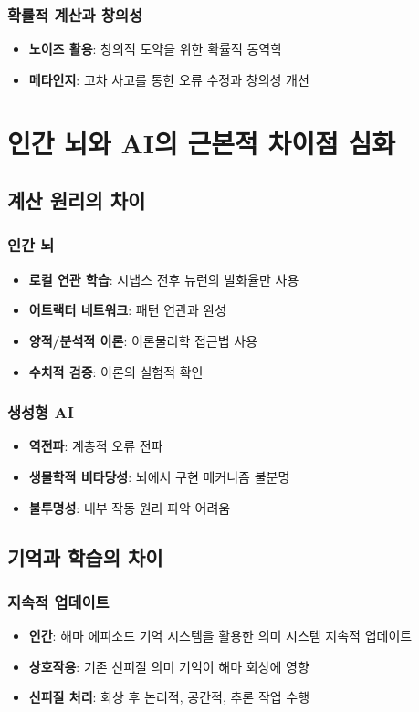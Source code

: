 \documentclass[openany]{book}
\begin{document}
\begin{appendices}
\subsubsection{확률적 계산과 창의성}
\begin{itemize}
\item \textbf{노이즈 활용}: 창의적 도약을 위한 확률적 동역학
\item \textbf{메타인지}: 고차 사고를 통한 오류 수정과 창의성 개선
\end{itemize}

\section{인간 뇌와 AI의 근본적 차이점 심화}

\subsection{계산 원리의 차이}

\subsubsection{인간 뇌}
\begin{itemize}
\item \textbf{로컬 연관 학습}: 시냅스 전후 뉴런의 발화율만 사용
\item \textbf{어트랙터 네트워크}: 패턴 연관과 완성
\item \textbf{양적/분석적 이론}: 이론물리학 접근법 사용
\item \textbf{수치적 검증}: 이론의 실험적 확인
\end{itemize}

\subsubsection{생성형 AI}
\begin{itemize}
\item \textbf{역전파}: 계층적 오류 전파
\item \textbf{생물학적 비타당성}: 뇌에서 구현 메커니즘 불분명
\item \textbf{불투명성}: 내부 작동 원리 파악 어려움
\end{itemize}

\subsection{기억과 학습의 차이}

\subsubsection{지속적 업데이트}
\begin{itemize}
\item \textbf{인간}: 해마 에피소드 기억 시스템을 활용한 의미 시스템 지속적 업데이트
\item \textbf{상호작용}: 기존 신피질 의미 기억이 해마 회상에 영향
\item \textbf{신피질 처리}: 회상 후 논리적, 공간적, 추론 작업 수행
\end{itemize}


\end{appendices}
\end{document}
